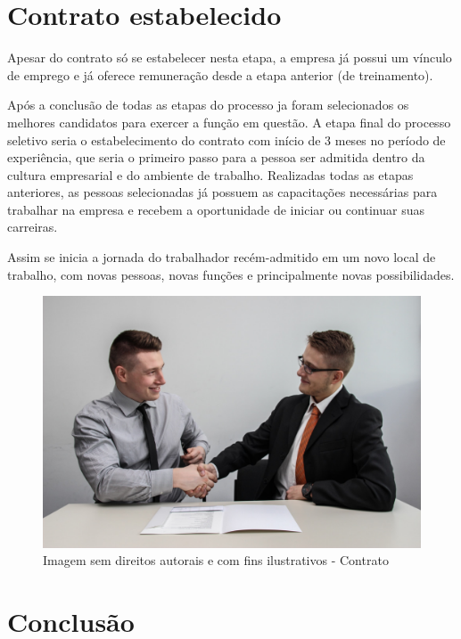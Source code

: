 \documentclass[12pt]{article}
\begin{document}
\section{Contrato estabelecido}

Apesar do contrato só se estabelecer nesta etapa, a empresa já possui um vínculo de emprego e já oferece remuneração desde a etapa anterior (de treinamento).

Após a conclusão de todas as etapas do processo ja foram selecionados os melhores candidatos para exercer a função em questão. A etapa final do processo seletivo seria o estabelecimento do contrato com início de 3 meses no período de experiência, que seria o primeiro passo para a pessoa ser admitida dentro da cultura empresarial e do ambiente de trabalho. Realizadas todas as etapas anteriores, as pessoas selecionadas já possuem as capacitações necessárias para trabalhar na empresa e recebem a oportunidade de iniciar ou continuar suas carreiras.

Assim se inicia a jornada do trabalhador recém-admitido em um novo local de trabalho, com novas pessoas, novas funções e principalmente novas possibilidades.

\begin{figure}[h]
	\centering
	\includegraphics[width=1.0\textwidth]{build/images/mao}
	\caption{Imagem sem direitos autorais e com fins ilustrativos - Contrato}
\end{figure}

\newpage

\section{Conclusão}
\end{document}
